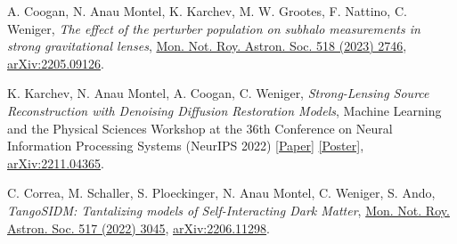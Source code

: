 \begin{itemize}[]

{\selectfont

 \item[\cite{Coogan:2022cky}] 
A. Coogan, {N. Anau Montel}, K. Karchev,  M. W. Grootes, F. Nattino, C. Weniger, \textit{The effect of the perturber population on subhalo measurements in strong gravitational lenses}, \href{https://doi.org/10.1093/mnras/stac3215}{Mon. Not. Roy. Astron. Soc. 518 (2023) 2746}, \href{https://arxiv.org/abs/2205.09126}{\ttfamily arXiv:2205.09126}.  \vskip 5pt

\item[\cite{Karchev:2022aa}] 
K. Karchev, {N. Anau Montel}, A. Coogan, C. Weniger, \textit{Strong-Lensing Source Reconstruction with Denoising Diffusion Restoration Models}, Machine Learning and the Physical Sciences Workshop at the 36th Conference on Neural Information Processing Systems (NeurIPS 2022) \href{https://ml4physicalsciences.github.io/2022/files/NeurIPS_ML4PS_2022_169.pdf}{[Paper]} \href{https://neurips.cc/media/PosterPDFs/NeurIPS%202022/56913.png}{[Poster]}, \href{https://arxiv.org/abs/2211.04365}{\ttfamily arXiv:2211.04365}. \vskip 5pt

\item[\cite{Correa:2022aa}] 
C. Correa, M. Schaller, S. Ploeckinger, {N. Anau Montel}, C. Weniger, S. Ando, \textit{TangoSIDM: Tantalizing models of Self-Interacting Dark Matter}, \href{https://doi.org/10.1093/mnras/stac2830}{Mon. Not. Roy. Astron. Soc. 517 (2022) 3045}, \href{https://arxiv.org/abs/2206.11298}{\ttfamily arXiv:2206.11298}. \vskip 5pt



}

\end{itemize}


\newpage

